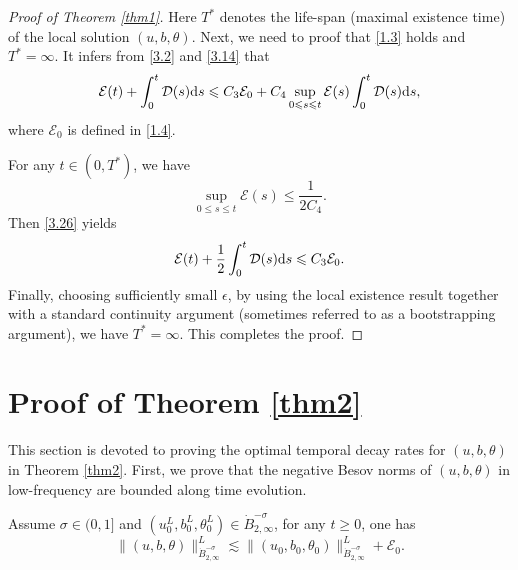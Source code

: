 \documentclass[reqno]{amsart}
\begin{document}
\begin{proof}[Proof of Theorem \ref{thm1}]
Here $T^*$ denotes the life-span (maximal existence time) of the local solution 
$(u,b,\theta)$. Next, we need to proof that \eqref{1.3} holds and $T^*=\infty$. 
It infers from \eqref{3.2} and \eqref{3.14} that
\begin{equation}\label{3.26}
 \mathcal{E}(t)+\int_0^t\mathcal{D}(s){\rm d}s\leqslant C_3\mathcal{E}_0+C_4\sup _{0\leqslant s\leqslant t}\mathcal{E}(s)\int_0^t\mathcal{D}(s){\rm d}s,
\end{equation}
where $\mathcal{E}_0$ is defined in \eqref{1.4}.

For any $t\in(0,T^*)$, we have 
\[
 \sup_{0\leqslant s\leqslant t}\mathcal{E}(s)\leqslant\frac{1}{2C_4}.
\]
Then \eqref{3.26} yields
\begin{equation}\label{3.27}
 \mathcal{E}(t)+\frac{1}{2}\int_0^t\mathcal{D}(s){\rm d}s\leqslant C_3\mathcal{E}_0.
\end{equation}
Finally, choosing sufficiently small $\epsilon$, by using the local existence result 
together with a standard continuity argument (sometimes referred to as a bootstrapping 
argument), we have $T^*=\infty$.
This completes the proof. 
\end{proof}

\section{Proof of Theorem \ref{thm2}}

This section is devoted to proving the optimal temporal decay rates for 
$(u,b,\theta)$ in Theorem \ref{thm2}. First, we prove that the negative Besov norms of 
$(u,b,\theta)$ in low-frequency are bounded along time evolution.

\begin{lemma}\label{lem4.1}
Assume $\sigma\in(0,1]$ and $(u_0^L,b_0^L,\theta_0^L)\in\dot{B}^{-\sigma}_{2,\infty}$, 
for any $t\geqslant0$, one has
\begin{equation}\label{4.1}
\|(u,b,\theta)\|^L_{\dot{B}^{-\sigma}_{2,\infty}}\lesssim\|(u_0,b_0,\theta_0)
\|^L_{\dot{B}^{-\sigma}_{2,\infty}}+\mathcal{E}_0.
\end{equation}
\end{lemma}
\end{document}
